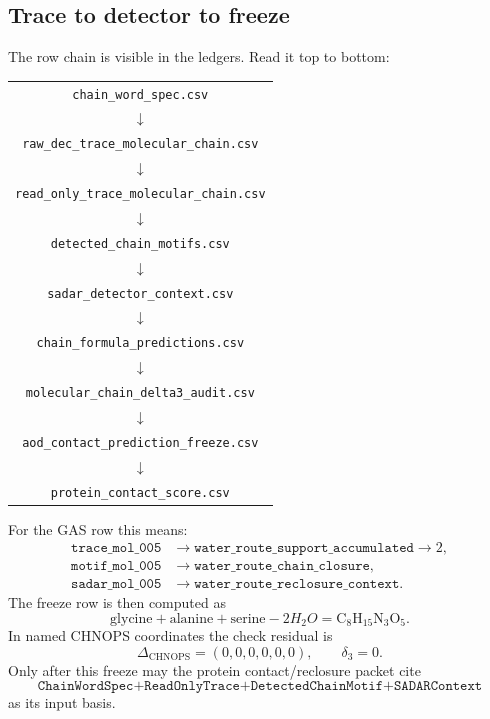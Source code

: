 \subsection{Trace to detector to freeze}

The row chain is visible in the ledgers. Read it top to bottom:
\begin{center}
\scriptsize
\begin{tabular}{@{}c@{}}
\texttt{chain\_word\_spec.csv} \\
$\downarrow$ \\
\texttt{raw\_dec\_trace\_molecular\_chain.csv} \\
$\downarrow$ \\
\texttt{read\_only\_trace\_molecular\_chain.csv} \\
$\downarrow$ \\
\texttt{detected\_chain\_motifs.csv} \\
$\downarrow$ \\
\texttt{sadar\_detector\_context.csv} \\
$\downarrow$ \\
\texttt{chain\_formula\_predictions.csv} \\
$\downarrow$ \\
\texttt{molecular\_chain\_delta3\_audit.csv} \\
$\downarrow$ \\
\texttt{aod\_contact\_prediction\_freeze.csv} \\
$\downarrow$ \\
\texttt{protein\_contact\_score.csv}
\end{tabular}
\end{center}
For the GAS row this means:
\begin{align*}
\texttt{trace\_mol\_005} &\to \texttt{water\_route\_support\_accumulated} \to 2,\\
\texttt{motif\_mol\_005} &\to \texttt{water\_route\_chain\_closure},\\
\texttt{sadar\_mol\_005} &\to \texttt{water\_route\_reclosure\_context}.
\end{align*}
The freeze row is then computed as
\[
\mathrm{glycine}+\mathrm{alanine}+\mathrm{serine}-2H_2O
=\mathrm{C}_8\mathrm{H}_{15}\mathrm{N}_3\mathrm{O}_5.
\]
In named CHNOPS coordinates the check residual is
\[
\Delta_{\mathrm{CHNOPS}}=(0,0,0,0,0,0),
\qquad
\delta_3=0.
\]
Only after this freeze may the protein contact/reclosure packet cite
\[
\texttt{ChainWordSpec+ReadOnlyTrace+DetectedChainMotif+SADARContext}
\]
as its input basis.

